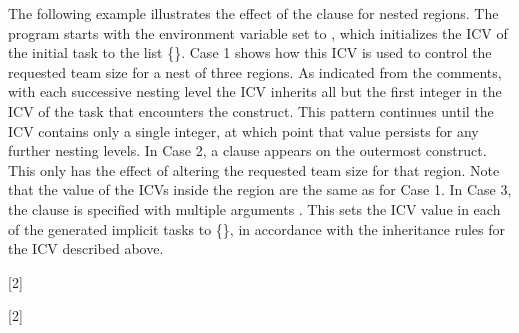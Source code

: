 The following example illustrates the effect of the  clause
for nested  regions. The program starts with the environment
variable  set to , which initializes the
 ICV of the initial task to the list \{\}. Case 1 shows 
how this ICV is used to control the requested team size for a nest of three 
 regions. As indicated from the comments, with each
successive nesting level the  ICV inherits all but the first
integer in the  ICV of the task that encounters the
 construct. This pattern continues until the 
ICV contains only a single integer, at which point that value persists for any
further nesting levels. In Case 2, a  clause appears on
the outermost  construct. This only has the effect of altering
the requested team size for that  region. Note that the value of
the  ICVs inside the  region are the same as
for Case 1. In Case 3, the  clause is specified with
multiple arguments . This sets the  ICV value in each of
the generated implicit tasks to \{\}, in accordance with the inheritance rules 
for the  ICV described above.

[2]

[2]

